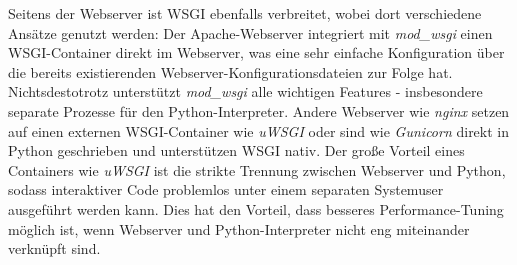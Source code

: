 Seitens der Webserver ist WSGI ebenfalls verbreitet, wobei dort verschiedene Ansätze genutzt werden:
Der Apache-Webserver integriert mit \emph{mod\_wsgi} einen WSGI-Container direkt im Webserver, was
eine sehr einfache Konfiguration über die bereits existierenden Webserver-Konfigurationsdateien zur
Folge hat. Nichtsdestotrotz unterstützt \emph{mod\_wsgi} alle wichtigen Features - insbesondere
separate Prozesse für den Python-Interpreter.
Andere Webserver wie \emph{nginx} setzen auf einen externen WSGI-Container wie \emph{uWSGI} oder
sind wie \emph{Gunicorn} direkt in Python geschrieben und unterstützen WSGI nativ.
Der große Vorteil eines Containers wie \emph{uWSGI} ist die strikte Trennung zwischen Webserver und
Python, sodass interaktiver Code problemlos unter einem separaten Systemuser ausgeführt werden kann.
Dies hat den Vorteil, dass besseres Performance-Tuning möglich ist, wenn Webserver und
Python-Interpreter nicht eng miteinander verknüpft sind.
